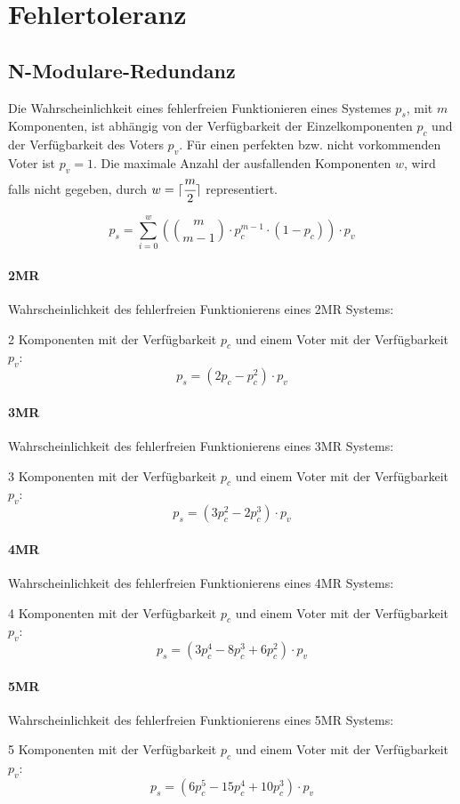 \section{Fehlertoleranz}

\subsection{N-Modulare-Redundanz}
Die Wahrscheinlichkeit eines fehlerfreien Funktionieren eines Systemes $p_{s}$, mit $m$ 
Komponenten, ist abhängig von der Verfügbarkeit der Einzelkomponenten $p_{c}$ und der
Verfügbarkeit des Voters $p_{v}$. Für einen perfekten bzw. nicht vorkommenden Voter
ist $p_{v} = 1$. Die maximale Anzahl der ausfallenden Komponenten $w$, wird falls nicht
gegeben, durch $w = \lceil \cfrac{m}{2} \rceil$ representiert.

\[
    p_{s} = \sum_{i = 0}^{w} \left( \binom{m}{m - 1} \cdot p_{c}^{m - 1} \cdot (1 - p_{c}) \right) \cdot p_{v}
\]

\paragraph{2MR} Wahrscheinlichkeit des fehlerfreien Funktionierens eines 2MR Systems:\par 
2 Komponenten mit der Verfügbarkeit $p_{c}$ und einem Voter mit der Verfügbarkeit $p_{v}$:
\[
    p_{s} = \left(2 p_{c} - p_{c}^{2} \right) \cdot p_{v}
\]

\paragraph{3MR} Wahrscheinlichkeit des fehlerfreien Funktionierens eines 3MR Systems:\par 
3 Komponenten mit der Verfügbarkeit $p_{c}$ und einem Voter mit der Verfügbarkeit $p_{v}$:
\[
    p_{s} = \left(3 p_{c}^{2} - 2 p_{c}^{3} \right) \cdot p_{v}
\]

\paragraph{4MR} Wahrscheinlichkeit des fehlerfreien Funktionierens eines 4MR Systems:\par 
4 Komponenten mit der Verfügbarkeit $p_{c}$ und einem Voter mit der Verfügbarkeit $p_{v}$:
\[
    p_{s} = \left(3 p_{c}^{4} - 8 p_{c}^{3} + 6 p_{c}^{2} \right) \cdot p_{v}
\]

\paragraph{5MR} Wahrscheinlichkeit des fehlerfreien Funktionierens eines 5MR Systems:\par 
5 Komponenten mit der Verfügbarkeit $p_{c}$ und einem Voter mit der Verfügbarkeit $p_{v}$:
\[
    p_{s} = \left(6 p_{c}^{5} - 15 p_{c}^{4} + 10 p_{c}^{3} \right) \cdot p_{v}
\]
